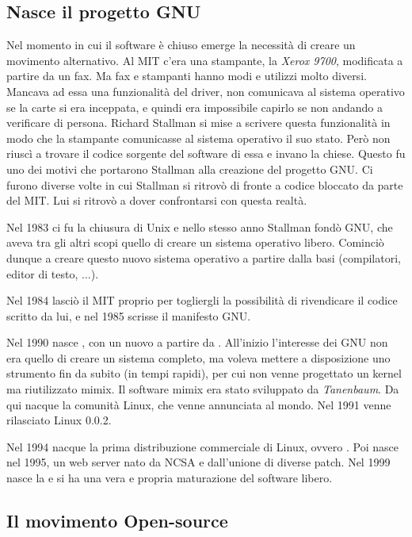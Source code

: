 \subsection{Nasce il progetto GNU}

Nel momento in cui il software è chiuso emerge la necessità di creare un movimento alternativo. Al MIT c'era una stampante, la \textit{Xerox 9700}, modificata a partire da un fax. Ma fax e stampanti hanno modi e utilizzi molto diversi. Mancava ad essa una funzionalità del driver, non comunicava al sistema operativo se la carte si era inceppata, e quindi era impossibile capirlo se non andando a verificare di persona. Richard Stallman si mise a scrivere questa funzionalità in modo che la stampante comunicasse al sistema operativo il suo stato. Però non riuscì a trovare il codice sorgente del software di essa e invano la chiese. Questo fu uno dei motivi che portarono Stallman alla creazione del progetto GNU. Ci furono diverse volte in cui Stallman si ritrovò di fronte a codice bloccato da parte del MIT. Lui si ritrovò a dover confrontarsi con questa realtà.

Nel 1983 ci fu la chiusura di Unix e nello stesso anno Stallman fondò GNU, che aveva tra gli altri scopi quello di creare un sistema operativo libero. Cominciò dunque a creare questo nuovo sistema operativo a partire dalla basi (compilatori, editor di testo, ...).

Nel 1984 lasciò il MIT proprio per togliergli la possibilità di rivendicare il codice scritto da lui, e nel 1985 scrisse il manifesto GNU.

Nel 1990 nasce , con un nuovo  a partire da . All'inizio l'interesse dei GNU non era quello di creare un sistema completo, ma voleva mettere a disposizione uno strumento fin da subito (in tempi rapidi), per cui non venne progettato un kernel ma riutilizzato mimix. Il software mimix era stato sviluppato da \textit{Tanenbaum}. Da qui nacque la comunità Linux, che venne annunciata al mondo. Nel 1991 venne rilasciato Linux 0.0.2.

Nel 1994 nacque la prima distribuzione commerciale di Linux, ovvero . Poi nasce  nel 1995, un web server nato da NCSA e dall'unione di diverse patch. Nel 1999 nasce la  e si ha una vera e propria maturazione del software libero.

\subsection{Il movimento Open-source}

